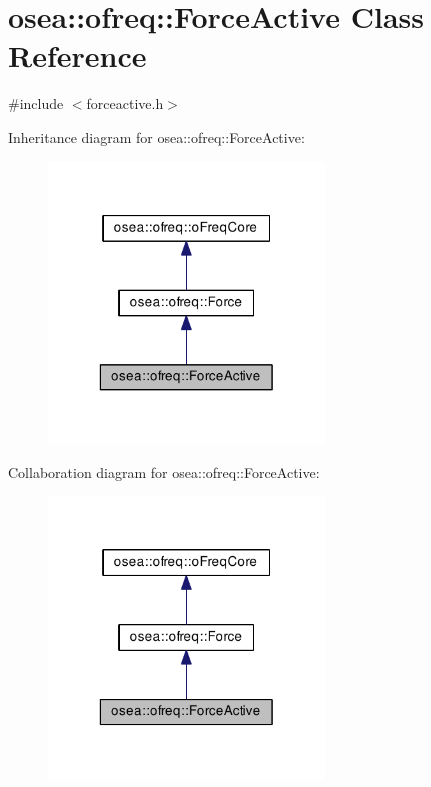 \hypertarget{classosea_1_1ofreq_1_1_force_active}{\section{osea\-:\-:ofreq\-:\-:Force\-Active Class Reference}
\label{classosea_1_1ofreq_1_1_force_active}
}


{\ttfamily \#include $<$forceactive.\-h$>$}



Inheritance diagram for osea\-:\-:ofreq\-:\-:Force\-Active\-:\nopagebreak
\begin{figure}[H]
\begin{center}
\leavevmode
\includegraphics[width=208pt]{classosea_1_1ofreq_1_1_force_active__inherit__graph}
\end{center}
\end{figure}


Collaboration diagram for osea\-:\-:ofreq\-:\-:Force\-Active\-:\nopagebreak
\begin{figure}[H]
\begin{center}
\leavevmode
\includegraphics[width=208pt]{classosea_1_1ofreq_1_1_force_active__coll__graph}
\end{center}
\end{figure}
